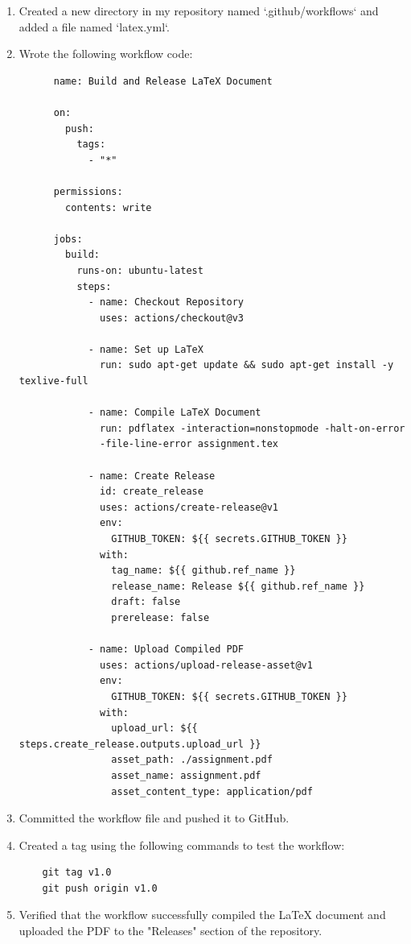 \documentclass{article}
\begin{document}
\begin{enumerate}
    \item Created a new directory in my repository named `.github/workflows` and added a file named `latex.yml`.
    \item Wrote the following workflow code:
    \begin{verbatim}
      name: Build and Release LaTeX Document

      on:
        push:
          tags:
            - "*"
      
      permissions:
        contents: write
      
      jobs:
        build:
          runs-on: ubuntu-latest
          steps:
            - name: Checkout Repository
              uses: actions/checkout@v3
      
            - name: Set up LaTeX
              run: sudo apt-get update && sudo apt-get install -y texlive-full
      
            - name: Compile LaTeX Document
              run: pdflatex -interaction=nonstopmode -halt-on-error 
              -file-line-error assignment.tex
      
            - name: Create Release
              id: create_release
              uses: actions/create-release@v1
              env:
                GITHUB_TOKEN: ${{ secrets.GITHUB_TOKEN }}
              with:
                tag_name: ${{ github.ref_name }}
                release_name: Release ${{ github.ref_name }}
                draft: false
                prerelease: false
      
            - name: Upload Compiled PDF
              uses: actions/upload-release-asset@v1
              env:
                GITHUB_TOKEN: ${{ secrets.GITHUB_TOKEN }}
              with:
                upload_url: ${{ steps.create_release.outputs.upload_url }}
                asset_path: ./assignment.pdf
                asset_name: assignment.pdf
                asset_content_type: application/pdf
    \end{verbatim}
    \item Committed the workflow file and pushed it to GitHub.
    \item Created a tag using the following commands to test the workflow:
    \begin{verbatim}
    git tag v1.0
    git push origin v1.0
    \end{verbatim}
    \item Verified that the workflow successfully compiled the LaTeX document and uploaded the PDF to the "Releases" section of the repository.
\end{enumerate}
\end{document}

